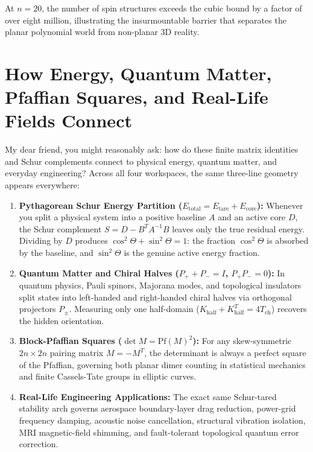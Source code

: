 \documentclass[11pt,a4paper]{article}
\theoremstyle{definition}
\begin{document}
At $n = 20$, the number of spin structures exceeds the cubic bound by a factor of over eight million, illustrating the insurmountable barrier that separates the planar polynomial world from non-planar 3D reality.


\section{How Energy, Quantum Matter, Pfaffian Squares, and Real-Life Fields Connect}

My dear friend, you might reasonably ask: how do these finite matrix identities and Schur complements connect to physical energy, quantum matter, and everyday engineering? Across all four workspaces, the same three-line geometry appears everywhere:

\begin{enumerate}
  \item \textbf{Pythagorean Schur Energy Partition ($E_{\mathrm{total}} = E_{\mathrm{tare}} + E_{\mathrm{core}}$):} Whenever you split a physical system into a positive baseline $A$ and an active core $D$, the Schur complement $S = D - B^T A^{-1} B$ leaves only the true residual energy. Dividing by $D$ produces $\cos^2\Theta + \sin^2\Theta = 1$: the fraction $\cos^2\Theta$ is absorbed by the baseline, and $\sin^2\Theta$ is the genuine active energy fraction.
  \item \textbf{Quantum Matter and Chiral Halves ($P_+ + P_- = I$, $P_+ P_- = 0$):} In quantum physics, Pauli spinors, Majorana modes, and topological insulators split states into left-handed and right-handed chiral halves via orthogonal projectors $P_\pm$. Measuring only one half-domain ($K_{\mathrm{half}} + K_{\mathrm{half}}^T = 4 T_{\mathrm{ch}}$) recovers the hidden orientation.
  \item \textbf{Block-Pfaffian Squares ($\det M = \mathrm{Pf}(M)^2$):} For any skew-symmetric $2n \times 2n$ pairing matrix $M = -M^T$, the determinant is always a perfect square of the Pfaffian, governing both planar dimer counting in statistical mechanics and finite Cassels-Tate groups in elliptic curves.
  \item \textbf{Real-Life Engineering Applications:} The exact same Schur-tared stability arch governs aerospace boundary-layer drag reduction, power-grid frequency damping, acoustic noise cancellation, structural vibration isolation, MRI magnetic-field shimming, and fault-tolerant topological quantum error correction.
\end{enumerate}
\end{document}
